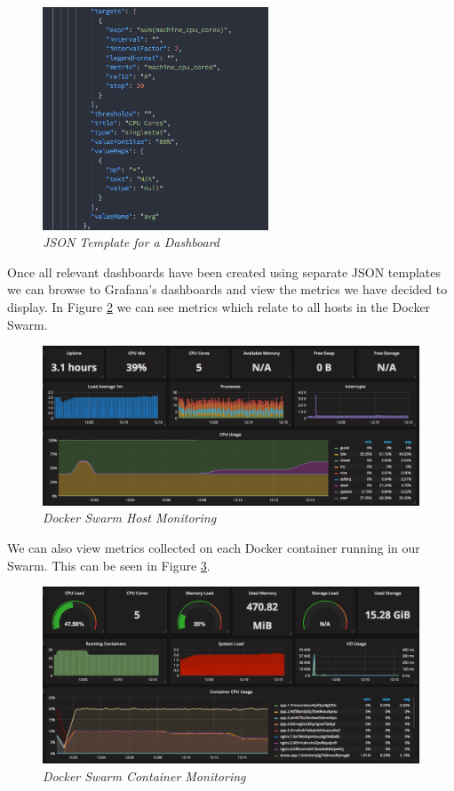 \begin{figure}[!h]
\centering
\includegraphics*[width=0.6\textwidth]{components/images/json-template}
\caption{\em JSON Template for a Dashboard}
\label{fig:json-template}
\end{figure}

Once all relevant dashboards have been created using separate JSON templates we can browse to Grafana's dashboards and view the metrics we have decided to display. In Figure \ref{fig:docker-host} we can see metrics which relate to all hosts in the Docker Swarm.

\begin{figure}[!h]
\centering
\includegraphics*[width=\textwidth]{components/images/docker-host}
\caption{\em Docker Swarm Host Monitoring}
\label{fig:docker-host}
\end{figure}

We can also view metrics collected on each Docker container running in our Swarm. This can be seen in Figure \ref{fig:docker-containers}.

\begin{figure}[!h]
\centering
\includegraphics*[width=\textwidth]{components/images/docker-containers}
\caption{\em Docker Swarm Container Monitoring}
\label{fig:docker-containers}
\end{figure}

